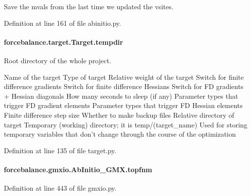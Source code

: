 Save the mvals from the last time we updated the vsites. 



Definition at line 161 of file abinitio.\-py.

\hypertarget{classforcebalance_1_1target_1_1Target_aa1f01b5b78db253b5b66384ed11ed193}{
\paragraph[{tempdir}]{\setlength{\rightskip}{0pt plus 5cm}forcebalance.\-target.\-Target.\-tempdir\hspace{0.3cm}{\ttfamily [inherited]}}}\label{classforcebalance_1_1target_1_1Target_aa1f01b5b78db253b5b66384ed11ed193}


Root directory of the whole project. 

Name of the target Type of target Relative weight of the target Switch for finite difference gradients Switch for finite difference Hessians Switch for F\-D gradients + Hessian diagonals How many seconds to sleep (if any) Parameter types that trigger F\-D gradient elements Parameter types that trigger F\-D Hessian elements Finite difference step size Whether to make backup files Relative directory of target Temporary (working) directory; it is temp/(target\-\_\-name) Used for storing temporary variables that don't change through the course of the optimization 

Definition at line 135 of file target.\-py.

\hypertarget{classforcebalance_1_1gmxio_1_1AbInitio__GMX_a885b702e86cd8978df92fbdac8dd36e9}{
\paragraph[{topfnm}]{\setlength{\rightskip}{0pt plus 5cm}forcebalance.\-gmxio.\-Ab\-Initio\-\_\-\-G\-M\-X.\-topfnm}}\label{classforcebalance_1_1gmxio_1_1AbInitio__GMX_a885b702e86cd8978df92fbdac8dd36e9}


Definition at line 443 of file gmxio.\-py.

